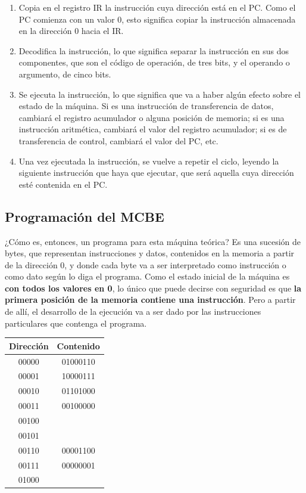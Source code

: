 \documentclass[spanish,a4paper,]{article}
\providecommand{\tightlist}{%
  \setlength{\itemsep}{0pt}\setlength{\parskip}{0pt}}
\begin{document}
\begin{enumerate}
\def\labelenumi{\arabic{enumi}.}
\tightlist
\item
  Copia en el registro IR la instrucción cuya dirección está en el PC.
  Como el PC comienza con un valor 0, esto significa copiar la
  instrucción almacenada en la dirección 0 hacia el IR.
\item
  Decodifica la instrucción, lo que significa separar la instrucción en
  sus dos componentes, que son el código de operación, de tres bits, y
  el operando o argumento, de cinco bits.
\item
  Se ejecuta la instrucción, lo que significa que va a haber algún
  efecto sobre el estado de la máquina. Si es una instrucción de
  transferencia de datos, cambiará el registro acumulador o alguna
  posición de memoria; si es una instrucción aritmética, cambiará el
  valor del registro acumulador; si es de transferencia de control,
  cambiará el valor del PC, etc.
\item
  Una vez ejecutada la instrucción, se vuelve a repetir el ciclo,
  leyendo la siguiente instrucción que haya que ejecutar, que será
  aquella cuya dirección esté contenida en el PC.
\end{enumerate}

\hypertarget{programaciuxf3n-del-mcbe}{%
\subsection{Programación del MCBE}\label{programaciuxf3n-del-mcbe}}

¿Cómo es, entonces, un programa para esta máquina teórica? Es una
sucesión de bytes, que representan instrucciones y datos, contenidos en
la memoria a partir de la dirección 0, y donde cada byte va a ser
interpretado como instrucción o como dato según lo diga el programa.
Como el estado inicial de la máquina es \textbf{con todos los valores en
0}, lo único que puede decirse con seguridad es que \textbf{la primera
posición de la memoria contiene una instrucción}. Pero a partir de allí,
el desarrollo de la ejecución va a ser dado por las instrucciones
particulares que contenga el programa.

\begin{longtable}[]{@{}cc@{}}
\toprule
Dirección & Contenido\tabularnewline
\midrule
\endhead
00000 & 01000110\tabularnewline
00001 & 10000111\tabularnewline
00010 & 01101000\tabularnewline
00011 & 00100000\tabularnewline
00100 &\tabularnewline
00101 &\tabularnewline
00110 & 00001100\tabularnewline
00111 & 00000001\tabularnewline
01000 &\tabularnewline
\bottomrule
\end{longtable}
\end{document}
